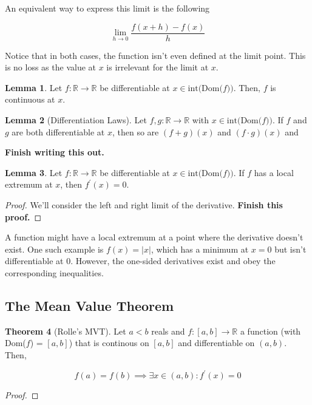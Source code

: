 \documentclass{article}
\theoremstyle{definition}
\newtheorem{theorem}{Theorem}[section]
\newtheorem{lemma}[theorem]{Lemma}
\newcommand{\R}{\mathbb{R}}
\begin{document}
An equivalent way to express this limit is the following

\[ \lim_{h \to 0} \frac{f(x+h) - f(x)}{h} \]

Notice that in both cases, the function isn't even defined at the limit point.
This is no loss as the value at $x$ is irrelevant for the limit at $x$.

\begin{lemma}
    Let $f: \R \xrightarrow{} \R$ be differentiable at $x \in \text{int(Dom($f$))}$.
    Then, $f$ is continuous at $x$.
\end{lemma}

\begin{lemma}[Differentiation Laws]
    Let $f,g: \R \xrightarrow{} \R$ with $x \in \text{int(Dom($f$))}$. If $f$ and $g$ are
    both differentiable at $x$, then so are $(f + g)(x)$ and $(f \cdot g)(x)$ and

    \textbf{Finish writing this out.}
\end{lemma}


\begin{lemma}
    Let $f: \R \xrightarrow{} \R$ be differentiable at $x \in \text{int(Dom($f$))}$.
    If $f$ has a local extremum at $x$, then $f^{\prime}(x) = 0$. 
\end{lemma}
\begin{proof}
    We'll consider the left and right limit of the derivative.
    \textbf{Finish this proof.}
\end{proof}

A function might have a local extremum at a point where the derivative doesn't exist.
One such example is $f(x) = \lvert x \rvert$, which has a minimum at $x=0$ but isn't differentiable
at $0$. However, the one-sided derivatives exist and obey the corresponding inequalities.

\subsection{The Mean Value Theorem}

\begin{theorem}[Rolle's MVT]\label{rolle_mvt}
    Let $a < b$ reals and $f: [a,b] \xrightarrow{} \R$ a function (with Dom($f$) = $[a,b]$)
    that is continous on $[a,b]$ and differentiable on $(a,b)$. Then,

    \[ f(a) = f(b) \implies \exists x \in (a,b): f^{\prime}(x) = 0\]
\end{theorem}
\begin{proof}
    
\end{proof}
\end{document}
